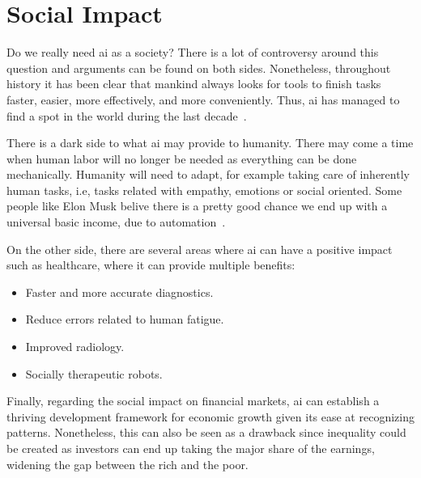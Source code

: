 \chapter{Social Impact}
\label{imp:impacto}

Do we really need \gls{ai} as a society? There is a lot of controversy around this question and arguments can be found on both sides. Nonetheless, throughout history it has been clear that mankind always looks for tools to finish tasks faster, easier, more effectively, and more conveniently. Thus, \gls{ai} has managed to find a spot in the world during the last decade~\cite{tai2020impact}.

There is a dark side to what \gls{ai} may provide to humanity. There may come a time when human labor will no longer be needed as everything can be done mechanically. Humanity will need to adapt, for example taking care of inherently human tasks, i.e, tasks related with empathy, emotions or social oriented. Some people like Elon Musk belive there is a pretty good chance we end up with a universal basic income, due to automation~\cite{elonBasicIncome}.

On the other side, there are several areas where \gls{ai} can have a positive impact such as healthcare, where it can provide multiple benefits:

\begin{itemize}
    \item Faster and more accurate diagnostics.
    \item Reduce errors related to human fatigue.
    \item Improved radiology.
    \item Socially therapeutic robots.
\end{itemize}

Finally, regarding the social impact on financial markets, \gls{ai} can establish a thriving development framework for economic growth given its ease at recognizing patterns. Nonetheless, this can also be seen as a drawback since inequality could be created as investors can end up taking the major share of the earnings, widening the gap between the rich and the poor.